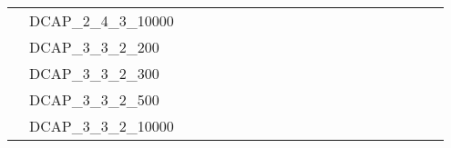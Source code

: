 \begin{table}[H]
{\begin{tabular}{|c|l|lll|lll|lllll|llll|lll|}
			& DCAP\_2\_4\_3\_10000          &                          &                         &                          &                          &                         &                          &                          &                         &                         &                          &                           &                             &                             &                             &                               &                          &                          &                           \\
			& DCAP\_3\_3\_2\_200            &                          &                         &                          &                          &                         &                          &                          &                         &                         &                          &                           &                             &                             &                             &                               &                          &                          &                           \\
			& DCAP\_3\_3\_2\_300            &                          &                         &                          &                          &                         &                          &                          &                         &                         &                          &                           &                             &                             &                             &                               &                          &                          &                           \\
			& DCAP\_3\_3\_2\_500            &                          &                         &                          &                          &                         &                          &                          &                         &                         &                          &                           &                             &                             &                             &                               &                          &                          &                           \\
			& DCAP\_3\_3\_2\_10000          &                          &                         &                          &                          &                         &                          &                          &                         &                         &                          &                           &                             &                             &                             &                               &                          &                          &                           \\

\end{tabular}}
\end{table}
